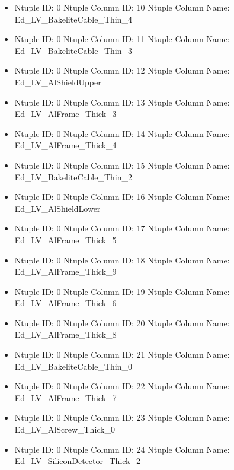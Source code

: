 \documentclass[8pt]{beamer}
\begin{document}
\begin{frame}
\begin{itemize}
        \item Ntuple ID: 0 Ntuple Column ID: 10 Ntuple Column Name: Ed\_LV\_BakeliteCable\_Thin\_4
        
        \item Ntuple ID: 0 Ntuple Column ID: 11 Ntuple Column Name: Ed\_LV\_BakeliteCable\_Thin\_3
        
        \item Ntuple ID: 0 Ntuple Column ID: 12 Ntuple Column Name: Ed\_LV\_AlShieldUpper
        
        \item Ntuple ID: 0 Ntuple Column ID: 13 Ntuple Column Name: Ed\_LV\_AlFrame\_Thick\_3
        
        \item Ntuple ID: 0 Ntuple Column ID: 14 Ntuple Column Name: Ed\_LV\_AlFrame\_Thick\_4
        
        \item Ntuple ID: 0 Ntuple Column ID: 15 Ntuple Column Name: Ed\_LV\_BakeliteCable\_Thin\_2
        
        \item Ntuple ID: 0 Ntuple Column ID: 16 Ntuple Column Name: Ed\_LV\_AlShieldLower
        
        \item Ntuple ID: 0 Ntuple Column ID: 17 Ntuple Column Name: Ed\_LV\_AlFrame\_Thick\_5
        
        \item Ntuple ID: 0 Ntuple Column ID: 18 Ntuple Column Name: Ed\_LV\_AlFrame\_Thick\_9
        
        \item Ntuple ID: 0 Ntuple Column ID: 19 Ntuple Column Name: Ed\_LV\_AlFrame\_Thick\_6
        
        \item Ntuple ID: 0 Ntuple Column ID: 20 Ntuple Column Name: Ed\_LV\_AlFrame\_Thick\_8
        
        \item Ntuple ID: 0 Ntuple Column ID: 21 Ntuple Column Name: Ed\_LV\_BakeliteCable\_Thin\_0
        
        \item Ntuple ID: 0 Ntuple Column ID: 22 Ntuple Column Name: Ed\_LV\_AlFrame\_Thick\_7
        
        \item Ntuple ID: 0 Ntuple Column ID: 23 Ntuple Column Name: Ed\_LV\_AlScrew\_Thick\_0
        
        \item Ntuple ID: 0 Ntuple Column ID: 24 Ntuple Column Name: Ed\_LV\_SiliconDetector\_Thick\_2
        

\end{itemize}
\end{frame}
\end{document}
